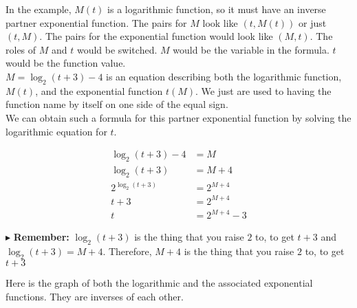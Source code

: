 \documentclass{ximera}
\begin{document}
In the example, $M(t)$ is a logarithmic function, so it must have an inverse partner exponential function.  The pairs for $M$ look like $(t, M(t))$ or just $(t,M)$. The pairs for the exponential function would look like $(M, t)$.  The roles of $M$ and $t$ would be switched. $M$ would be the variable in the formula. $t$ would be the function value.\\


$M = \log_2(t+3) - 4$ is an equation describing both the logarithmic function, $M(t)$, and the exponential function $t(M)$.  We just are used to having the function name by itself on one side of the equal sign. \\


We can obtain such a formula for this partner exponential function by solving the logarithmic equation for $t$.





\begin{align*}
\log_2(t+3) - 4 & = M \\
\log_2(t+3) & = M + 4 \\
2^{\log_2(t+3)} & = 2^{M+4} \\
t+3 & = 2^{M+4} \\
t & = 2^{M+4} - 3
\end{align*}


$\blacktriangleright$ \textbf{Remember:} $\log_2(t+3)$ is the thing that you raise $2$ to, to get $t+3$ and $\log_2(t+3) = M+4$.  Therefore, $M+4$ is the thing that you raise $2$ to, to get $t+3$





Here is the graph of both the logarithmic and the associated exponential functions. They are inverses of each other.
\end{document}
